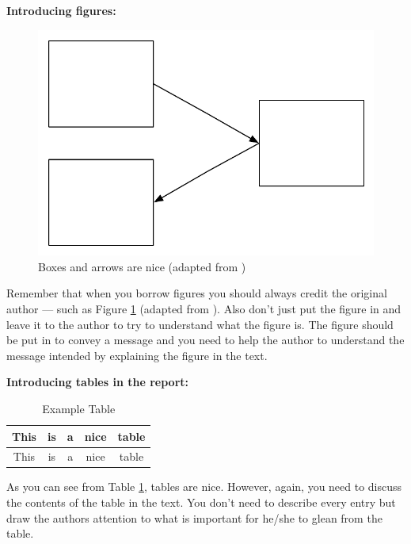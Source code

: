 \vspace{0.5cm}

\noindent
{\bf Introducing figures:} \\

\begin{figure}[ht]
    \begin{center}
        \includegraphics[width=0.5\columnwidth]{figs/figure1.pdf}
        \caption[Boxes and arrows are nice]{Boxes and arrows are nice (adapted from \citet{Bandara2019})}
        \label{fig:BoxesAndArrowsAreNice}
    \end{center}
\end{figure}
\begin{tcolorbox}[width=\linewidth, sharp corners=all, colback=white!96!black]

    Remember that when you borrow figures you should always credit the original author --- such as Figure \ref{fig:BoxesAndArrowsAreNice} (adapted from \citet{Bandara2019}). Also don't just put the figure in and leave it to the author to try to understand what the figure is. The figure should be put in to convey a message and you need to help the author to understand the message intended by explaining the figure in the text.
\end{tcolorbox}

\vspace{0.5cm}

\noindent
{\bf Introducing tables in the report: }\\

\begin{table}[htbp]
    \begin{center}
        \begin{tabular}{|c|c|c|c|c|}\hline\hline
            This & is & a & nice & table \\\hline
            This & is & a & nice & table \\\hline\hline
        \end{tabular}
        \caption{Example Table}
    \end{center}
    \label{tab:ExampleTable}
\end{table}%

\begin{tcolorbox}[width=\linewidth, sharp corners=all, colback=white!96!black]
    As you can see from Table \ref{tab:ExampleTable}, tables are nice. However, again, you need to discuss the contents of the table in the text. You don't need to describe every entry but draw the authors attention to what is important for he/she to glean from the table.
\end{tcolorbox}

